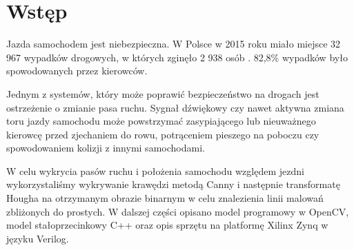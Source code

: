 \section{Wstęp}

Jazda samochodem jest niebezpieczna. W Polsce w 2015 roku miało miejsce 32 967 wypadków drogowych, w których zginęło 2 938 osób \cite{policja}. 82,8\% wypadków było spowodowanych przez kierowców.

Jednym z systemów, który może poprawić bezpieczeństwo na drogach jest ostrzeżenie o zmianie pasa ruchu. Sygnał dźwiękowy czy nawet aktywna zmiana toru jazdy samochodu może powstrzymać zasypiającego lub nieuważnego kierowcę przed zjechaniem do rowu, potrąceniem pieszego na poboczu czy spowodowaniem kolizji z innymi samochodami.

W celu wykrycia pasów ruchu i położenia samochodu względem jezdni wykorzystaliśmy wykrywanie krawędzi metodą Canny i następnie transformatę Hougha na otrzymanym obrazie binarnym w celu znalezienia linii malowań zbliżonych do prostych. W dalszej części opisano model programowy w OpenCV, model stałoprzecinkowy C++ oraz opis sprzętu na platformę Xilinx Zynq w języku Verilog.

